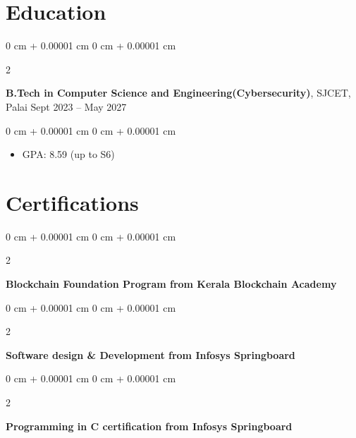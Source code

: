 \documentclass[10pt, a4paper]{article}
\newenvironment{highlights}{
    \begin{itemize}[
        topsep=0.10 cm,
        parsep=0.10 cm,
        partopsep=0pt,
        itemsep=0pt,
        leftmargin=0 cm + 10pt
    ]
}{
    \end{itemize}
} %
\newenvironment{onecolentry}{
    \begin{adjustwidth}{
        0 cm + 0.00001 cm
    }{
        0 cm + 0.00001 cm
    }
}{
    \end{adjustwidth}
} %
\newenvironment{twocolentry}[2][]{
    \onecolentry
    \def\secondColumn{#2}
    \setcolumnwidth{\fill, 4.5 cm}
    \begin{paracol}{2}
}{
    \switchcolumn \raggedleft \secondColumn
    \end{paracol}
    \endonecolentry
} %
\begin{document}
 \section{Education}
     
        \begin{twocolentry}{
            Sept 2023 – May 2027
        }
            \textbf{B.Tech in Computer Science and Engineering(Cybersecurity)},   SJCET, Palai\end{twocolentry}

        \vspace{0.10 cm}
        \begin{onecolentry}
            \begin{highlights}
                \item GPA: 8.59 (up to S6)
            \end{highlights}
        \end{onecolentry}

\section{Certifications}
    
        \begin{samepage}  
            \begin{twocolentry}{
            }
                \textbf{Blockchain Foundation Program from Kerala Blockchain Academy}
                \end{twocolentry}
                
            \begin{twocolentry}{
            }
                \textbf{Software design \& Development from Infosys Springboard}
                \end{twocolentry}
        \end{samepage}

        \begin{twocolentry}{
            }
                \textbf{Programming in C certification from Infosys Springboard}
                \end{twocolentry}
\end{document}
